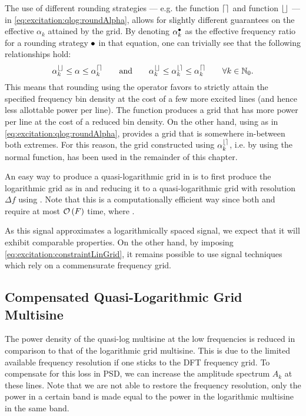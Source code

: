   \begin{remark}
  The use of different rounding strategies --- e.g. the  function $\left\lceil  \right\rceil$  and  function $\left\lfloor  \right\rfloor$ --- in \eqref{eq:excitation:qlog:roundAlpha}, allows for slightly different guarantees on the effective $\alpha_k$ attained by the grid.
  By denoting $\alpha_k^{\bullet}$ as the effective frequency ratio for a rounding strategy $\bullet$  in that equation, one can trivially see that the following relationships hold:
  \begin{equation}
  \alpha_k^{\left\lfloor  \right\rfloor} \leq \alpha \leq  \alpha_k^{\left\lceil  \right\rceil}
  \qquad \text{and} \qquad
  \alpha_k^{\left\lfloor  \right\rfloor} \leq \alpha_k^{\left\lfloor  \right\rceil} \leq  \alpha_k^{\left\lceil  \right\rceil}
  \qquad
  \forall k \in \mathbb{N}_{0}
  \text{.}
  \end{equation}
  This means that rounding using the  operator favors to strictly attain the specified frequency bin density at the cost of a few more excited lines (and hence less allottable power per line).
  The  function produces a grid that has more power per line at the cost of a reduced bin density.
  On the other hand, using  as in \eqref{eq:excitation:qlog:roundAlpha}, provides a grid that is somewhere in-between both extremes.
  For this reason, the grid constructed using $\alpha_k^{\left\lfloor  \right\rceil}$, i.e. by using the normal  function, has been used in the remainder of this chapter.
  \end{remark}

  \begin{example} \label{eg:excitation:quasilogarithmicGrid:matlab}
  An easy way to produce a quasi-logarithmic grid in \MATLAB is to first produce the logarithmic grid  as in   and reducing it to a quasi-logarithmic grid with resolution $\Delta f$ using .
  Note that this is a computationally efficient way since both  and  require at most $\mathcal{O} \left(  F  \right)$ time, where .
  \end{example}

  As this signal approximates a logarithmically spaced signal,  we expect that it will exhibit comparable properties.
  On the other hand, by imposing \eqref{eq:excitation:constraintLinGrid}, it remains
  possible to use signal techniques which rely on a commensurate frequency grid.

\subsection{Compensated Quasi-Logarithmic Grid Multisine}
  The power density of the quasi-log multisine at the low frequencies is reduced in comparison to that of the logarithmic grid multisine.
  This is due to the limited available frequency resolution if one sticks to the \gls{DFT} frequency grid.
  To compensate for this loss in \gls{PSD}, we can increase the amplitude spectrum $A_k$ at these lines.
  Note that we are not able to restore the frequency resolution, only the power in a certain band is made equal to the power in the logarithmic multisine in the same band.

